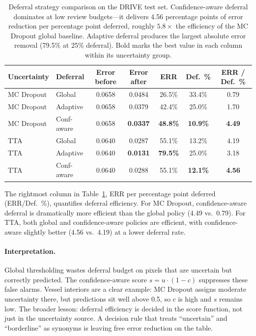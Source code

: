 \begin{table}[H]
\centering
\caption{Deferral strategy comparison on the DRIVE test set. Confidence-aware
deferral dominates at low review budgets---it delivers 4.56 percentage points
of error reduction per percentage point deferred, roughly $5.8\times$ the
efficiency of the MC Dropout global baseline. Adaptive deferral produces the
largest absolute error removal (79.5\% at 25\% deferral). Bold marks the best
value in each column within its uncertainty group.}
\label{tab:deferral_comparison}
\scriptsize
\setlength{\tabcolsep}{3.5pt}
\renewcommand{\arraystretch}{1.03}
\begin{center}
\begin{tabular}{l l c c c c c}
\toprule
\textbf{Uncertainty} & \textbf{Deferral} & \textbf{Error before} &
\textbf{Error after} & \textbf{ERR} & \textbf{Def.\ \%} &
\textbf{ERR / Def.\ \%} \\
\midrule
MC Dropout & Global      & 0.0658 & 0.0484 & 26.5\% & 33.4\% & 0.79 \\
MC Dropout & Adaptive    & 0.0658 & 0.0379 & 42.4\% & 25.0\% & 1.70 \\
MC Dropout & Conf-aware  & 0.0658 & \textbf{0.0337} & \textbf{48.8\%} & \textbf{10.9\%} & \textbf{4.49} \\
\addlinespace[2pt]
\midrule
\addlinespace[2pt]
TTA        & Global      & 0.0640 & 0.0287 & 55.1\% & 13.2\% & 4.19 \\
TTA        & Adaptive    & 0.0640 & \textbf{0.0131} & \textbf{79.5\%} & 25.0\% & 3.18 \\
TTA        & Conf-aware  & 0.0640 & 0.0288 & 55.1\% & \textbf{12.1\%} & \textbf{4.56} \\
\bottomrule
\end{tabular}
\end{center}
\end{table}

The rightmost column in Table~\ref{tab:deferral_comparison}, ERR per
percentage point deferred (ERR/Def.\ \%), quantifies deferral efficiency.
For MC Dropout, confidence-aware deferral is dramatically more efficient than
the global policy (4.49 vs.\ 0.79). For TTA, both global and confidence-aware
policies are efficient, with confidence-aware slightly better (4.56 vs.\ 4.19)
at a lower deferral rate.

\paragraph{Interpretation.} Global thresholding wastes deferral budget on
pixels that are uncertain but correctly predicted. The confidence-aware
score $s = u \cdot (1 - c)$ suppresses these false alarms. Vessel
interiors are a clear example: MC Dropout assigns moderate uncertainty
there, but predictions sit well above 0.5, so $c$ is high and $s$ remains
low. The broader lesson: deferral efficiency is decided in the score
function, not just in the uncertainty source. A decision rule that treats
``uncertain'' and ``borderline'' as synonyms is leaving free error
reduction on the table.

